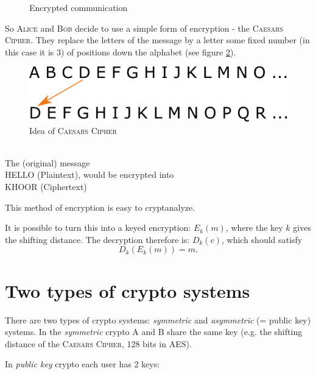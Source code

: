 \begin{figure}[H]
  \caption{Encrypted communication}
  \label{fig:caesar_cipher}
\end{figure}

So \textsc{Alice} and \textsc{Bob} decide to use a simple form of encryption - the \textsc{Caesars Cipher}. They replace the letters of the message by a letter some fixed number (in this case it is 3) of positions down the alphabet (see figure \ref{fig:caesar_cipher_ill}).

\begin{figure}[h]
\centering\includegraphics[scale=0.4]{Chapter1/Pictures/caesar_cipher_ill}
\caption{Idea of \textsc{Caesars Cipher}}
\label{fig:caesar_cipher_ill}
\end{figure}

\begin{example}
\ \\
The (original) message \\
 \textsc{HELLO} (Plaintext), 
 would be encrypted into \\
 \textsc{KHOOR} (Ciphertext)
\end{example}

This method of encryption is easy to cryptanalyze.

It is possible to turn this into a keyed encryption: $E_k(m)$, where the key $k$ gives the shifting distance. The decryption therefore is: $D_k(c)$, which should satisfy
\[
D_k(E_k(m)) = m.
\]


\section{Two types of crypto systems}

There are two types of crypto systems: \emph{symmetric} and \emph{asymmetric} (= public key) systems. In the \emph{symmetric} crypto \textsc{A} and \textsc{B} share the same key (e.g. the shifting distance of the \textsc{Caesars Cipher}, 128 bits in \textsc{AES}).

In \emph{public key} crypto each user has 2 keys:

